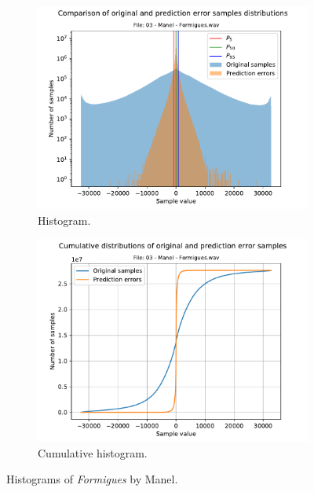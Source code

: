 \begin{figure}[h!]
	\centering
	\begin{subfigure}{0.5\textwidth}
		\centering
		\includegraphics[width=\linewidth]{images/03 - Manel - Formigues.wav_hist.pdf}
		\caption{Histogram.}
		\label{fig:hist_formiques}
	\end{subfigure}%
	\begin{subfigure}{0.5\textwidth}
		\centering
		\includegraphics[width=\linewidth]{images/03 - Manel - Formigues.wav_hist_cum.pdf}
		\caption{Cumulative histogram.}
		\label{fig:cum_hists_formigues}
	\end{subfigure}
	\caption{Histograms of \textit{Formigues} by Manel.}
	\label{fig:formigues}
\end{figure}

